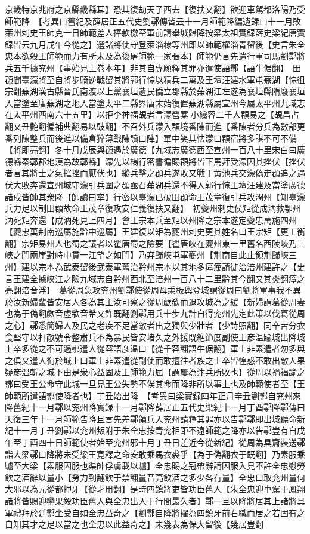 京畿特京兆府之京縣畿縣耳】恐其復劫天子西去【復扶又翻】欲迎車駕都洛陽乃受師範降　【考異曰舊紀及薛居正五代史劉鄩傳皆云十一月師範降編遺録曰十一月敗萊州刺史王師克一日師範差人捧款檄至軍前請舉城歸降按梁太祖實録薛史梁紀唐實録皆云九月戊午今從之】選諸將使守登萊淄棣等州即以師範權淄青留後【史言朱全忠本欲殺王師範而力有所未及為後屠師範一家張本】師範仍言先遣行軍司馬劉鄩將兵五千據兖州【事始見上卷本年】非其自專願釋其罪亦遣使語鄩【語牛倨翻】　田頵聞臺濛將至自將步騎逆戰留其將郭行悰以精兵二萬及王壇汪建水軍屯蕪湖【悰徂宗翻蕪湖漢古縣晉氏南渡以上黨襄垣遺民僑立郡縣於蕪湖江左遂為襄垣縣隋廢襄垣入當塗至唐蕪湖之地入當塗太平二縣界唐末始復置蕪湖縣屬宣州今屬太平州九域志在太平州西南六十五里】以拒李神福覘者言濛營寨小纔容二千人頵易之【覘昌占翻又丑艶翻徧補典翻易以豉翻】不召外兵濛入頵境番陳而進【番陳者分兵為數部更番列陳整兵而後進以備倉猝薄戰陳讀曰陣】軍中笑其怯濛曰頵宿將多謀不可不備【將即亮翻】冬十月戊辰與頵遇於廣德【九域志廣德西至宣州一百八十里宋白曰廣德縣秦鄣郡地漢為故鄣縣】濛先以楊行密書徧賜頵將皆下馬拜受濛因其挫伏【挫伏者言其將士之氣摧挫而厭伏也】縱兵擊之頵兵遂敗又戰于黄池兵交濛偽走頵追之遇伏大敗奔還宣州城守濛引兵圍之頵亟召蕪湖兵還不得入郭行悰王壇汪建及當塗廣德諸戍皆帥其衆降【帥讀曰率】行密以臺濛已破田頵命王茂章復引兵攻潤州【知臺濛兵力足以制田頵故命王茂章復攻安仁義復扶又翻】　初夔州刺史侯矩從成汭救卾州汭死矩奔還【成汭死見上四月】會王宗本兵至矩以州降之宗本遂定夔忠萬施四州【夔忠萬荆南巡屬施黔中巡屬】王建復以矩為夔州刺史更其姓名曰王宗矩【更工衡翻】宗矩易州人也蜀之議者以瞿唐蜀之險要【瞿唐峽在夔州東一里舊名西陵峽乃三峽之門兩崖對峙中貫一江望之如門】乃弃歸峽屯軍夔州【荆南自此止領荆歸峽三州】建以宗本為武泰留後武泰軍舊治黔州宗本以其地多瘴癘請徙治涪州建許之【史言王建全據峽江之險九域志自黔州西北至涪州一百八十二里黔其今翻又其炎翻瘴之亮翻涪音浮】　葛從周急攻兖州劉鄩使從周母乘板輿登城謂從周曰劉將軍事我不異於汝新婦輩皆安居人各為其主汝可察之從周歔欷而退攻城為之緩【新婦謂葛從周妻也為于偽翻歔音虛欷音希又許既翻劉鄩用兵十步九計自得兖州先定此策以伐葛從周之心】鄩悉簡婦人及民之老疾不足當敵者出之獨與少壯者【少詩照翻】同辛苦分衣食堅守以扞敵號令整肅兵不為暴民皆安堵久之外援既絶節度副使王彦温踰城出降城上卒多從之不可遏鄩遣人從容語彦温曰【從千容翻語牛倨翻】軍士非素遣者勿多與之俱又遣人徇於城上曰軍士非素遣從副使而敢擅往者族之士卒皆惶惑不敢出敵人果疑彦温斬之城下由是衆心益固及王師範力屈【謂屢為汴兵所敗也】從周以禍福諭之鄩曰受王公命守此城一旦見王公失勢不俟其命而降非所以事上也及師範使者至【王師範所遣語鄩使降者也】丁丑始出降　【考異曰梁實録四年正月辛丑劉鄩自兖州來降舊紀十一月鄩以兖州降實録十一月鄩降薛居正五代史梁紀十一月丁酉鄩降鄩傳曰天復三年十一月師範告降且言先差鄩領兵入兖州請釋其罪亦以告鄩鄩即出城聽命新紀十一月丁丑劉鄩以兖州叛附于朱全忠按青兖相距不遠師範之降亦以告鄩豈有自戊午至丁酉四十日師範使者始至兖州邪十月丁丑日差近今從新紀】從周為具齎裝送鄩詣大梁鄩曰降將未受梁王寛釋之命安敢乘馬衣裘乎【為于偽翻衣于既翻】乃素服乘驢至大梁【素服囚服也渠帥俘虜載以驢】全忠賜之冠帶辭請囚服入見不許全忠慰勞飲之酒辭以量小【勞力到翻飲于禁翻量音亮飲酒之多少各有量】全忠曰取兖州量何大邪以為元從都押牙【從才用翻】是時四鎮將吏皆功臣舊人【朱全忠迎車駕于鳳翔諸將皆賜迎鑾果毅功臣舊人與全忠出入于行間最久者】鄩一旦以降將居其上諸將具軍禮拜於廷鄩坐受自如全忠益奇之【劉鄩自降將擢為四鎮牙前右職而居之若固有之自知其才之足以當之也全忠以此益奇之】未幾表為保大留後【幾居豈翻